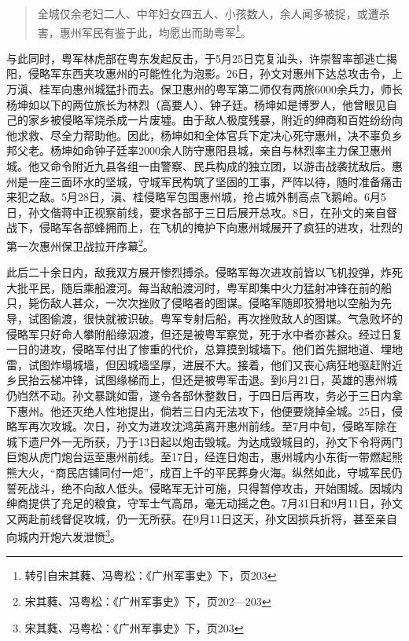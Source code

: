 \begin{quote}
全城仅余老妇二人、中年妇女四五人、小孩数人，余人闻多被捉，或遭杀害，惠州军民有鉴于此，均愿出而助粤军\footnote{转引自宋其蕤、冯粤松：《广州军事史》下，页203}。
\end{quote}

与此同时，粤军林虎部在粤东发起反击，于5月25日克复汕头，许崇智率部逃亡揭阳，侵略军东西夹攻惠州的可能性化为泡影。26日，孙文对惠州下达总攻击令，上万滇、桂军向惠州城猛扑而去。保卫惠州的粤军第二师仅有两旅6000余兵力，师长杨坤如以下的两位旅长为林烈（高要人）、钟子廷。杨坤如是博罗人，他曾眼见自己的家乡被侵略军烧杀成一片废墟。由于敌人极度残暴，附近的绅商和百姓纷纷向他求救、尽全力帮助他。因此，杨坤如和全体官兵下定决心死守惠州，决不辜负乡邦父老。杨坤如命钟子廷率2000余人防守惠阳县城，亲自与林烈率主力保卫惠州城。他又命令附近九县各组一由警察、民兵构成的独立团，以游击战袭扰敌后。惠州是一座三面环水的坚城，守城军民构筑了坚固的工事，严阵以待，随时准备痛击来犯之敌。5月28日，滇、桂侵略军包围惠州城，抢占城外制高点飞鹅岭。6月5日，孙文偕蒋中正视察前线，要求各部于三日后展开总攻。8日，在孙文的亲自督战下，侵略军各部蜂拥而上，在飞机的掩护下向惠州城展开了疯狂的进攻，壮烈的第一次惠州保卫战拉开序幕\footnote{宋其蕤、冯粤松：《广州军事史》下，页202—203}。

此后二十余日内，敌我双方展开惨烈搏杀。侵略军每次进攻前皆以飞机投弹，炸死大批平民，随后乘船渡河。每当敌船渡河时，粤军即集中火力猛射冲锋在前的船只，毙伤敌人甚众，一次次挫败了侵略者的图谋。侵略军随即狡猾地以空船为先导，试图偷渡，很快就被识破。粤军专射后船，再次挫败敌人的图谋。气急败坏的侵略军只好命人攀附船缘泅渡，但还是被粤军察觉，死于水中者亦甚众。经过日复一日的进攻，侵略军付出了惨重的代价，总算摸到城墙下。他们首先掘地道、埋地雷，试图炸塌城墙，但因城墙坚厚，进展不大。接着，他们又丧心病狂地驱赶附近乡民抬云梯冲锋，试图缘梯而上，但还是被粤军击退。到6月21日，英雄的惠州城仍岿然不动。孙文暴跳如雷，遂令各部休整数日，于四日后再攻，务必于三日内拿下惠州。他还灭绝人性地提出，倘若三日内无法攻下，他便要烧掉全城。25日，侵略军再次攻城。次日，孙文为进攻沈鸿英离开惠州前线。至7月中旬，侵略军除在城下遗尸外一无所获，乃于13日起以炮击毁城。为达成毁城目的，孙文下令将两门巨炮从虎门炮台运至惠州前线。至17日，经连日炮击，惠州城内小东街一带燃起熊熊大火，“商民店铺同付一炬”，成百上千的平民葬身火海。纵然如此，守城军民仍誓死战斗，绝不向敌人低头。侵略军无计可施，只得暂停攻击，开始围城。因城内绅商提供了充足的粮食，守军士气高昂，毫无动摇之色。7月31日和9月11日，孙文又两赴前线督促攻城，仍一无所获。在9月11日这天，孙文因损兵折将，甚至亲自向城内开炮六发泄愤\footnote{宋其蕤、冯粤松：《广州军事史》下，页203}。

